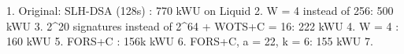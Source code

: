 1. Original: SLH-DSA (128s) : 770 kWU on Liquid
2. W = 4 instead of 256: 500 kWU 
3. 2^20 signatures instead of 2^64 + WOTS+C = 16: 222 kWU
4. W = 4 : 160 kWU
5. FORS+C : 156k kWU
6. FORS+C, a = 22, k = 6: 155 kWU 
7. 